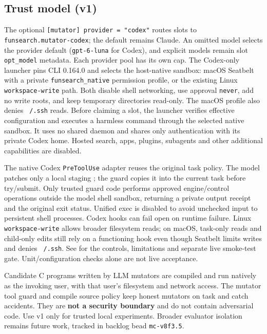 \documentclass[11pt]{article}
\newcommand{\code}[1]{\texttt{#1}}
\begin{document}
\subsection{Trust model (v1)}
The optional \code{[mutator] provider = "codex"} routes slots to
\code{funsearch.mutator-codex}; the default remains Claude. An omitted model
selects the provider default (\code{gpt-6-luna} for Codex), and explicit models
remain slot \code{opt\_model} metadata. Each provider pool has its own cap.
The Codex-only launcher pins CLI 0.164.0 and selects the host-native sandbox:
macOS Seatbelt with a private \code{funsearch\_native} permission profile, or
the existing Linux \code{workspace-write} path. Both disable shell networking,
use approval \code{never}, add no write roots, and keep temporary directories
read-only. The macOS profile also denies \code{~/.ssh} reads. Before claiming a
slot, the launcher verifies effective configuration and executes a harmless
command through the selected native sandbox. It uses no shared daemon and
shares only authentication with its private Codex home. Hosted search, apps,
plugins, subagents and other additional capabilities are disabled.

The native Codex \code{PreToolUse} adapter reuses the original task policy.
The model patches only a local staging ; the guard copies it into
the current task before try/submit. Only trusted guard code performs approved
engine/control operations outside the model shell sandbox, returning a private
output receipt and the original exit status. Unified exec is disabled to avoid
unchecked input to persistent shell processes. Codex hooks can fail open on
runtime failure. Linux \code{workspace-write} allows broader filesystem reads;
on macOS, task-only reads and child-only edits still rely on a functioning hook
even though Seatbelt limits writes and denies \code{~/.ssh}. See
 for the controls, limitations and separate live
smoke-test gate. Unit/configuration checks alone are not live acceptance.

Candidate C programs written by LLM mutators are compiled and run natively as
the invoking user, with that user's filesystem and network access. The mutator
tool guard and compile source policy keep honest mutators on task and catch
accidents. They are \textbf{not a security boundary} and do not contain
adversarial code. Use v1 only for trusted local experiments. Broader evaluator
isolation remains future work, tracked in backlog bead \code{mc-v8f3.5}.
\end{document}
